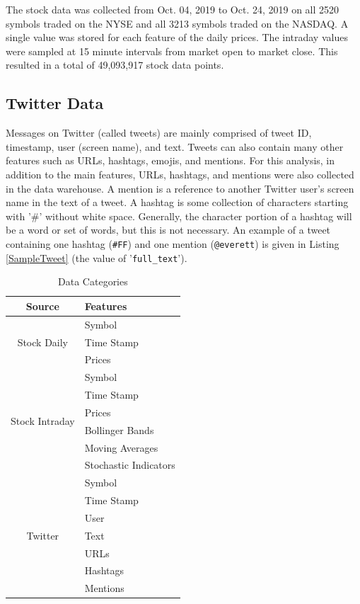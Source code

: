 \documentclass[journal]{IEEEtran}
\begin{document}
The stock data was collected from Oct. 04, 2019 to Oct. 24, 2019 on
 all 2520 symbols traded on the NYSE and all 3213 symbols traded on the NASDAQ.
A single value was stored for each feature of the daily prices.
The intraday values were sampled at 15 minute intervals from market open
 to market close.
This resulted in a total of 49,093,917 stock data points.

\subsection{Twitter Data}

Messages on Twitter (called tweets) are mainly comprised of
 tweet ID, timestamp, user (screen name), and text.
Tweets can also contain many other features such as
 URLs, hashtags, emojis,  and mentions.
For this analysis, in addition to the main features,
 URLs, hashtags, and mentions were also collected in the data warehouse.
A mention is a reference to another Twitter user's screen name
 in the text of a tweet.
A hashtag is some collection of characters starting with
 '\#' without white space.
Generally, the character portion of a hashtag will be a word or set of words,
 but this is not necessary.
An example of a tweet containing one hashtag (\texttt{\#FF}) and one 
mention (\texttt{@everett}) is given in Listing \ref{SampleTweet} (the value of
 '\texttt{full\_text}').

\begin{table}
	\renewcommand{\arraystretch}{1.3}
	\caption{Data Categories}
	\label{DataCategories}
	\centering
	\begin{tabular}{c l}
		\hline
		\hline
		\textbf{Source}       & \textbf{Features}\\
		\hline
		\multirow{3}{*}{Stock Daily} &  Symbol \\
		&  Time Stamp \\
		&  Prices \\
		\hline
		\multirow{6}{*}{Stock Intraday} &  Symbol \\
		&  Time Stamp \\
		&  Prices \\
		&  Bollinger Bands \\
		&  Moving Averages \\
		&  Stochastic Indicators \\
		\hline
		\multirow{7}{*}{Twitter} &  Symbol \\
		&  Time Stamp \\
		&  User \\
		&  Text \\
		&  URLs \\
		&  Hashtags \\
		&  Mentions \\
		\hline
		\hline
	\end{tabular}
\end{table}
\end{document}
